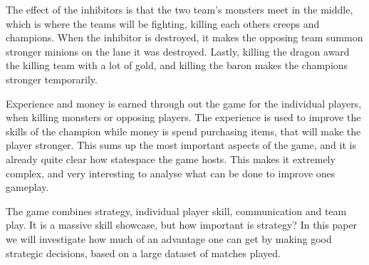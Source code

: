 The effect of the inhibitors is that the two team's monsters meet in the middle, which is where the teams will be fighting, killing each others creeps and champions. When the inhibitor is destroyed, it makes the opposing team summon stronger minions on the lane it was destroyed. Lastly, killing the dragon award the killing team with a lot of gold, and killing the baron makes the champions stronger temporarily.

Experience and money is earned through out the game for the individual players, when killing monsters or opposing players. The experience is used to improve the skills of the champion while money is spend purchasing items, that will make the player stronger. This sums up the most important aspects of the game, and it is already quite clear how statespace the game hosts. This makes it extremely complex, and very interesting to analyse what can be done to improve ones gameplay. 

The game combines strategy, individual player skill, communication and team play. It is a massive skill showcase, but how important is strategy? In this paper we will investigate how much of an advantage one can get by making good strategic decisions, based on a large dataset of matches played.


